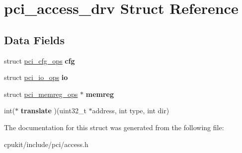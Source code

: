 \hypertarget{structpci__access__drv}{}\section{pci\+\_\+access\+\_\+drv Struct Reference}
\label{structpci__access__drv}
\subsection*{Data Fields}
\begin{DoxyCompactItemize}
\item 
\mbox{\label{structpci__access__drv_ac0e43f8e42d8bfae18a684c609a99fc7}} 
struct \mbox{\hyperlink{structpci__cfg__ops}{pci\+\_\+cfg\+\_\+ops}} {\bfseries cfg}
\item 
\mbox{\label{structpci__access__drv_ae7ef88842027ff6715f0c9e9182b1b6b}} 
struct \mbox{\hyperlink{structpci__io__ops}{pci\+\_\+io\+\_\+ops}} {\bfseries io}
\item 
\mbox{\label{structpci__access__drv_acdb6cab8bcf1a702136059ee8021f4d4}} 
struct \mbox{\hyperlink{structpci__memreg__ops}{pci\+\_\+memreg\+\_\+ops}} $\ast$ {\bfseries memreg}
\item 
\mbox{\label{structpci__access__drv_a84beb42a4ad275188c147204405d854c}} 
int($\ast$ {\bfseries translate} )(uint32\+\_\+t $\ast$address, int type, int dir)
\end{DoxyCompactItemize}


The documentation for this struct was generated from the following file\+:\begin{DoxyCompactItemize}
\item 
cpukit/include/pci/access.\+h\end{DoxyCompactItemize}
